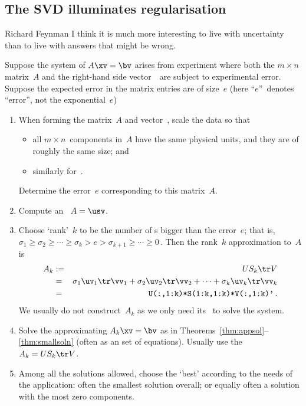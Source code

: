 \subsection{The SVD illuminates regularisation}
\label{sec:svdir}

\begin{quoted}{Richard Feynman}
I think it is much more interesting to live with uncertainty than to live with answers that might be wrong.
\end{quoted}

\begin{procedure} \label{pro:appmat}
Suppose the system of  \(A\xv=\bv\) arises from experiment where both the \(m\times n\) matrix~\(A\) and the right-hand side vector~\bv\ are subject to experimental error.  
Suppose the expected error in the matrix entries are of size~\(e\) (here ``\(e\)''~denotes ``error'', not the exponential~\(e\))
\begin{enumerate}
\item When forming the matrix~\(A\) and vector~\bv, scale the data so that 
\begin{itemize}
\item all \(m\times n\)~components in~\(A\) have the same physical units, and they are of roughly the same size; and
\item similarly for~\bv.
\end{itemize}
Determine the error~\(e\) corresponding to this matrix~\(A\).
 
\item Compute an \svd\ \(A=\usv\).

\item Choose `rank'~\(k\) to be the number of s bigger than the error~\(e\); that is, \(\sigma_1\geq \sigma_2\geq\cdots \geq \sigma_k>e>\sigma_{k+1}\geq \cdots\geq 0\)\,.
Then the rank~\(k\) approximation to~\(A\) is
\begin{eqnarray*}
A_k&:=&US_k\tr V
\\&=&\sigma_1\uv_1\tr\vv_1+\sigma_2\uv_2\tr\vv_2+\cdots+\sigma_k\uv_k\tr\vv_k
\\&=&\verb|U(:,1:k)*S(1:k,1:k)*V(:,1:k)'|\,.
\end{eqnarray*}
We usually do not construct~\(A_k\) as we only need its \svd\ to solve the system.

\item Solve the approximating  \(A_k\xv=\bv\) as in Theorems~\ref{thm:appsol}--\ref{thm:smallsoln} (often as an  set of equations).
Usually use the \svd\ \(A_k=US_k\tr V\).

\item Among all the solutions allowed, choose the `best' according to the needs of the application: often the smallest solution overall; or equally often a solution with the most zero components.
\end{enumerate}
\end{procedure}


